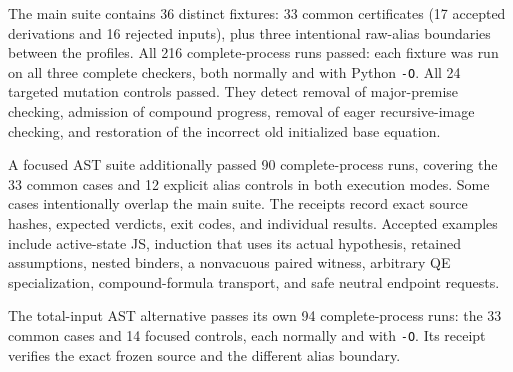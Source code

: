 The main suite contains 36 distinct fixtures: 33 common certificates
(17 accepted derivations and 16 rejected inputs), plus three intentional
raw-alias boundaries between the profiles. All 216 complete-process
runs passed: each fixture was run on all three complete checkers, both
normally and with Python \texttt{-O}. All 24 targeted mutation controls
passed. They detect removal of major-premise checking, admission of
compound progress, removal of eager recursive-image checking, and
restoration of the incorrect old initialized base equation.

A focused AST suite additionally passed 90 complete-process runs,
covering the 33 common cases and 12 explicit alias controls in both
execution modes. Some cases intentionally overlap the main suite.
The receipts record exact source hashes, expected verdicts, exit codes,
and individual results. Accepted examples include active-state JS,
induction that uses its actual hypothesis, retained assumptions, nested
binders, a nonvacuous paired witness, arbitrary QE specialization,
compound-formula transport, and safe neutral endpoint requests.

The total-input AST alternative passes its own 94 complete-process runs:
the 33 common cases and 14 focused controls, each normally and with
\texttt{-O}. Its receipt verifies the exact frozen source and the
different alias boundary.
